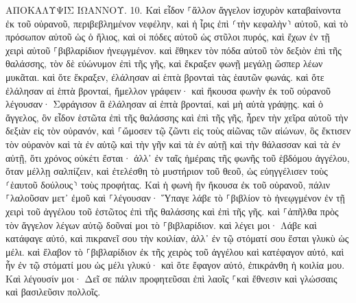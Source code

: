 \documentclass[twoside, 9pt]{extreport}
\begin{document}
ΑΠΟΚΑΛΥΨΙΣ ΙΩΑΝΝΟΥ.
10.
Καὶ εἶδον ⸀ἄλλον ἄγγελον ἰσχυρὸν καταβαίνοντα ἐκ τοῦ οὐρανοῦ, περιβεβλημένον νεφέλην, καὶ ἡ ἶρις ἐπὶ ⸂τὴν κεφαλὴν⸃ αὐτοῦ, καὶ τὸ πρόσωπον αὐτοῦ ὡς ὁ ἥλιος, καὶ οἱ πόδες αὐτοῦ ὡς στῦλοι πυρός, 
καὶ ἔχων ἐν τῇ χειρὶ αὐτοῦ ⸀βιβλαρίδιον ἠνεῳγμένον. καὶ ἔθηκεν τὸν πόδα αὐτοῦ τὸν δεξιὸν ἐπὶ τῆς θαλάσσης, τὸν δὲ εὐώνυμον ἐπὶ τῆς γῆς, 
καὶ ἔκραξεν φωνῇ μεγάλῃ ὥσπερ λέων μυκᾶται. καὶ ὅτε ἔκραξεν, ἐλάλησαν αἱ ἑπτὰ βρονταὶ τὰς ἑαυτῶν φωνάς. 
καὶ ὅτε ἐλάλησαν αἱ ἑπτὰ βρονταί, ἤμελλον γράφειν· καὶ ἤκουσα φωνὴν ἐκ τοῦ οὐρανοῦ λέγουσαν· Σφράγισον ἃ ἐλάλησαν αἱ ἑπτὰ βρονταί, καὶ μὴ αὐτὰ γράψῃς. 
καὶ ὁ ἄγγελος, ὃν εἶδον ἑστῶτα ἐπὶ τῆς θαλάσσης καὶ ἐπὶ τῆς γῆς, ἦρεν τὴν χεῖρα αὐτοῦ τὴν δεξιὰν εἰς τὸν οὐρανόν, 
καὶ ⸀ὤμοσεν τῷ ζῶντι εἰς τοὺς αἰῶνας τῶν αἰώνων, ὃς ἔκτισεν τὸν οὐρανὸν καὶ τὰ ἐν αὐτῷ καὶ τὴν γῆν καὶ τὰ ἐν αὐτῇ καὶ τὴν θάλασσαν καὶ τὰ ἐν αὐτῇ, ὅτι χρόνος οὐκέτι ἔσται· 
ἀλλ᾽ ἐν ταῖς ἡμέραις τῆς φωνῆς τοῦ ἑβδόμου ἀγγέλου, ὅταν μέλλῃ σαλπίζειν, καὶ ἐτελέσθη τὸ μυστήριον τοῦ θεοῦ, ὡς εὐηγγέλισεν τοὺς ⸂ἑαυτοῦ δούλους⸃ τοὺς προφήτας. 
Καὶ ἡ φωνὴ ἣν ἤκουσα ἐκ τοῦ οὐρανοῦ, πάλιν ⸀λαλοῦσαν μετ᾽ ἐμοῦ καὶ ⸀λέγουσαν· Ὕπαγε λάβε τὸ ⸀βιβλίον τὸ ἠνεῳγμένον ἐν τῇ χειρὶ τοῦ ἀγγέλου τοῦ ἑστῶτος ἐπὶ τῆς θαλάσσης καὶ ἐπὶ τῆς γῆς. 
καὶ ⸀ἀπῆλθα πρὸς τὸν ἄγγελον λέγων αὐτῷ δοῦναί μοι τὸ ⸀βιβλαρίδιον. καὶ λέγει μοι· Λάβε καὶ κατάφαγε αὐτό, καὶ πικρανεῖ σου τὴν κοιλίαν, ἀλλ᾽ ἐν τῷ στόματί σου ἔσται γλυκὺ ὡς μέλι. 
καὶ ἔλαβον τὸ ⸀βιβλαρίδιον ἐκ τῆς χειρὸς τοῦ ἀγγέλου καὶ κατέφαγον αὐτό, καὶ ἦν ἐν τῷ στόματί μου ὡς μέλι γλυκύ· καὶ ὅτε ἔφαγον αὐτό, ἐπικράνθη ἡ κοιλία μου. 
Καὶ λέγουσίν μοι· Δεῖ σε πάλιν προφητεῦσαι ἐπὶ λαοῖς ⸀καὶ ἔθνεσιν καὶ γλώσσαις καὶ βασιλεῦσιν πολλοῖς. 
\end{document}
